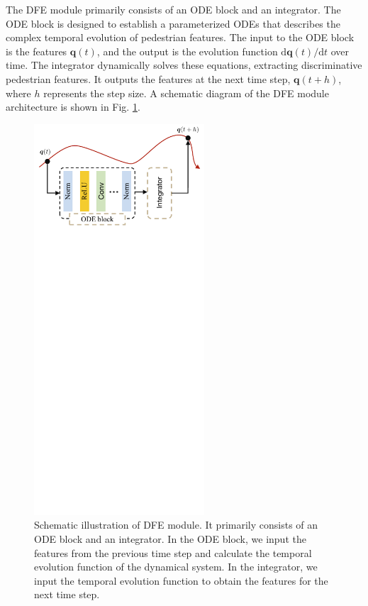 \documentclass[12pt]{spieman}  %
\begin{document}
\begin{spacing}{2}
		The DFE module primarily consists of an ODE block and an integrator. The ODE block is designed to establish a parameterized ODEs that describes the complex temporal evolution of pedestrian features. The input to the ODE block is the features $\boldsymbol{q}(t)$, and the output is the evolution function ${\mathrm{d}\boldsymbol{q}(t)}/{\mathrm{d}t}$ over time. The integrator dynamically solves these equations, extracting discriminative pedestrian features. It outputs the features at the next time step, $\boldsymbol{q}(t + h)$, where $h$ represents the step size. A schematic diagram of the DFE module architecture is shown in Fig. \ref{fig:ode_module}.
		
		\begin{figure}[!htbp]
			\centering
			\includegraphics[width=2.5in]{Figure_2}
			\caption{Schematic illustration of DFE module. It primarily consists of an ODE block and an integrator. In the ODE block, we input the features from the previous time step and calculate the temporal evolution function of the dynamical system. In the integrator, we input the temporal evolution function to obtain the features for the next time step.}
			\label{fig:ode_module}
		\end{figure}
		

\end{spacing}
\end{document}
